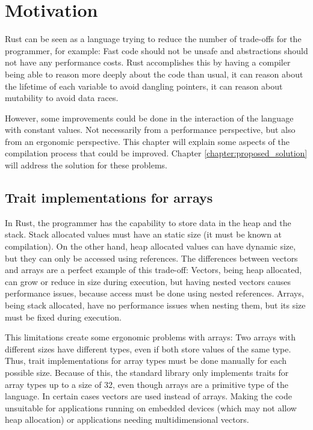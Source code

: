 \chapter{Motivation}
Rust can be seen as a language trying to reduce the number of trade-offs for the programmer, for example: Fast code should not be unsafe and abstractions should not have any performance costs. Rust accomplishes this by having a compiler being able to reason more deeply about the code than usual, it can reason about the lifetime of each variable to avoid dangling pointers, it can reason about mutability to avoid data races. 

However, some improvements could be done in the interaction of the language with constant values. Not necessarily from a performance perspective, but also from an ergonomic perspective. This chapter will explain some aspects of the compilation process that could be improved. Chapter \ref{chapter:proposed_solution} will address the solution for these problems.

\label{chapter:motivation}
\section{Trait implementations for arrays}
In Rust, the programmer has the capability to store data in the heap and the stack. Stack allocated values must have an static size (it must be known at compilation). On the other hand, heap allocated values can have dynamic size, but they can only be accessed using references. The differences between vectors and arrays are a perfect example of this trade-off: Vectors, being heap allocated, can grow or reduce in size during execution, but having nested vectors causes performance issues, because access must be done using nested references. Arrays, being stack allocated, have no performance issues when nesting them, but its size must be fixed during execution.

This limitations create some ergonomic problems with arrays: Two arrays with different sizes have different types, even if both store values of the same type. Thus, trait implementations for array types must be done manually for each possible size. Because of this, the standard library only implements traits for array types up to a size of 32, even though arrays are a primitive type of the language. In certain cases vectors are used instead of arrays. Making the code unsuitable for applications running on embedded devices (which may not allow heap allocation) or applications needing multidimensional vectors.

